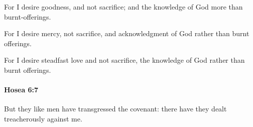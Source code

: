 			\begin{versebox}
					\item[BHS] 
					\item[LXX] 
					\item[ASV] For I desire goodness, and not sacrifice; and the knowledge of God more than burnt-offerings.
					\item[NIV] For I desire mercy, not sacrifice, and acknowledgment of God rather than burnt offerings.
					\item[NRSV] For I desire steadfast love and not sacrifice, the knowledge of God rather than burnt offerings.
			\end{versebox}

		\paragraph{Hosea 6:7} %
			\label{HOSEA-6-7}

			But they like men have transgressed the covenant: there have they dealt treacherously against me.


